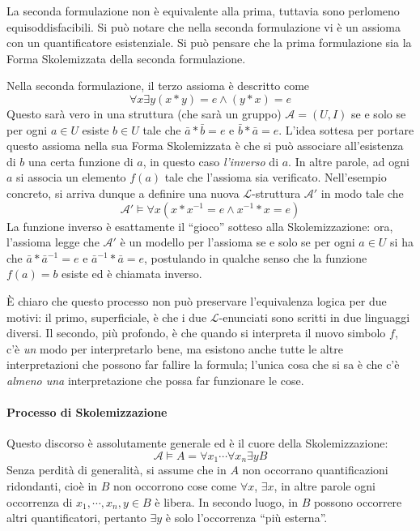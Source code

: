 La seconda formulazione non è equivalente alla prima, tuttavia sono perlomeno 
equisoddisfacibili. Si può notare che nella seconda formulazione vi è un assioma 
con un quantificatore esistenziale. Si può pensare che la prima 
formulazione sia la Forma Skolemizzata della seconda formulazione. 
 
Nella seconda formulazione, il terzo assioma è descritto come 
$$
\forall x \exists y (x * y) = e \land (y * x) = e
$$
Questo sarà vero in una struttura (che sarà un gruppo) $\mathscr{A} = (U,I)$ se e 
solo se per ogni $a \in U$ esiste $b \in U$ tale che $\bar{a} * \bar{b} = e$ 
e $\bar{b} * \bar{a} = e$. L'idea sottesa per portare questo assioma 
nella sua Forma Skolemizzata è che si può associare all'esistenza di $b$ una 
certa funzione di $a$, in questo caso \textit{l'inverso} di $a$. In altre 
parole, ad ogni $a$ si associa un elemento $f(a)$ tale che l'assioma sia verificato. 
Nell'esempio concreto, si arriva dunque a definire una nuova $\mathscr{L}$-struttura $\mathscr{A}'$
in modo tale che 
$$
\mathscr{A}' \models \forall x (x*x^{-1} = e \land x^{-1} * x = e)
$$
La funzione inverso è esattamente il ``gioco'' sotteso alla Skolemizzazione: 
ora, l'assioma legge che $\mathscr{A}'$ è un modello per l'assioma 
se e solo se per ogni $a \in U$ si ha che $\bar{a} * \bar{a}^{-1} = e$ 
e $\bar{a}^{-1} * \bar{a} = e$, postulando in qualche senso che  la funzione
$f(a) = b$ esiste ed è chiamata inverso. 

\`E chiaro che questo processo non può preservare l'equivalenza logica per 
due motivi: il primo, superficiale, è che i due $\mathscr{L}$-enunciati 
sono scritti in due linguaggi diversi. Il secondo, più profondo, è che 
quando si interpreta il nuovo simbolo $f$, c'è \textit{un} modo per interpretarlo 
bene, ma esistono anche tutte le altre interpretazioni che possono 
far fallire la formula; l'unica cosa che si sa è che c'è \textit{almeno una}
interpretazione che possa far funzionare le cose. 

\paragraph{Processo di Skolemizzazione}
Questo discorso è assolutamente generale ed è il cuore della Skolemizzazione: 
$$
\mathscr{A} \models A =  \forall x_1\cdots\forall x_n \exists y B
$$
Senza perdità di generalità, si assume che in $A$ non occorrano quantificazioni ridondanti, cioè in $B$ non occorrono cose come $\forall x$, $\exists x$, in altre parole ogni occorrenza di $x_1, \cdots, x_n, y \in B$ è libera. In secondo luogo, in $B$ possono occorrere altri quantificatori, pertanto $\exists y$ è solo l'occorrenza ``più esterna''. 

